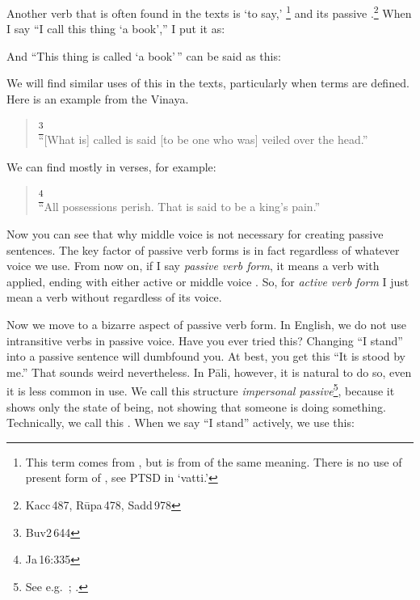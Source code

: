 Another verb that is often found in the texts is `to say,' \footnote{This term comes from , but  is from  of the same meaning. There is no use of present form of , see PTSD in `vatti.'} and its passive .\footnote{Kacc\,487, R\=upa\,478, Sadd\,978} When I say ``I call this thing `a book','' I put it as:


And ``This thing is called `a book'\,'' can be said as this:


We will find similar uses of this in the texts, particularly when terms are defined. Here is an example from the Vinaya.

\begin{quote}
\footnote{Buv2\,644}\\
``[What is] called  is said [to be one who was] veiled over the head.''
\end{quote}

We can find  mostly in verses, for example:

\begin{quote}
\footnote{Ja\,16:335}\\
``All possessions perish. That is said to be a king's pain.''
\end{quote}

Now you can see that why middle voice is not necessary for creating passive sentences. The key factor of passive verb forms is in fact  regardless of whatever voice we use. From now on, if I say \emph{passive verb form}, it means a verb with  applied, ending with either active or middle voice . So, for \emph{active verb form} I just mean a verb without  regardless of its voice.

Now we move to a bizarre aspect of passive verb form. In English, we do not use intransitive verbs in passive voice. Have you ever tried this? Changing ``I stand'' into a passive sentence will dumbfound you. At best, you get this ``It is stood by me.'' That sounds weird nevertheless. In P\=ali, however, it is natural to do so, even it is less common in use. We call this structure \emph{impersonal passive}\footnote{See e.g.\ \citealp[p.~146]{collins:grammar}; \citealp[p.~42]{warder:intro}.}, because it shows only the state of being, not showing that someone is doing something. Technically, we call this . When we say ``I stand'' actively, we use this:

